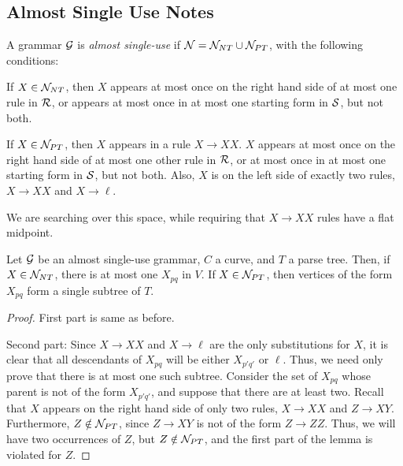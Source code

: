 \documentclass{article}
\begin{document}
\subsection{Almost Single Use Notes}

\begin{defn}
A grammar ${\mathcal G}$ is {\em almost single-use} if ${\mathcal N} = {\mathcal N}_{NT} \cup
{\mathcal N}_{PT}$, with the following conditions:
\bitem
\item If $X\in {\mathcal N}_{NT}$, then $X$ appears at most once on the right
  hand side of at most one rule in ${\mathcal R}$, or appears at most once in
  at most one starting form in ${\mathcal S}$, but not both.
\item If $X\in {\mathcal N}_{PT}$, then $X$ appears in a rule $X\to XX$. $X$
  appears at most once on the right hand side of at most one other
  rule in ${\mathcal R}$, or at most once in at most one starting form in
  ${\mathcal S}$, but not both. Also, $X$ is on the left side of exactly two
  rules, $X\to XX$ and $X\to \ell$.
\eitem
\end{defn}

We are searching over this space, while requiring that $X\to XX$ rules
have a flat midpoint.

\begin{lem}
Let ${\mathcal G}$ be an almost single-use grammar, $C$ a curve, and $T$ a
parse tree. Then, if $X\in {\mathcal N}_{NT}$, there is at most one $X_{pq}$
in $V$. If $X\in {\mathcal N}_{PT}$, then vertices of the form $X_{pq}$ form a
single subtree of $T$.
\end{lem}
\begin{proof}
First part is same as before.

Second part: Since $X\to XX$ and $X\to \ell$ are the only
substitutions for $X$, it is clear that all descendants of $X_{pq}$
will be either $X_{p'q'}$ or $\ell$. Thus, we need only prove that
there is at most one such subtree. Consider the set of $X_{pq}$ whose
parent is not of the form $X_{p'q'}$, and suppose that there are at
least two. Recall that $X$ appears on the right hand side of only two
rules, $X\to XX$ and $Z\to XY$. Furthermore, $Z\notin {\mathcal N}_{PT}$, since
$Z\to XY$ is not of the form $Z\to ZZ$. Thus, we will have two
occurrences of $Z$, but $Z\notin {\mathcal N}_{PT}$, and the first part of the
lemma is violated for $Z$.
\end{proof}


\end{document}
